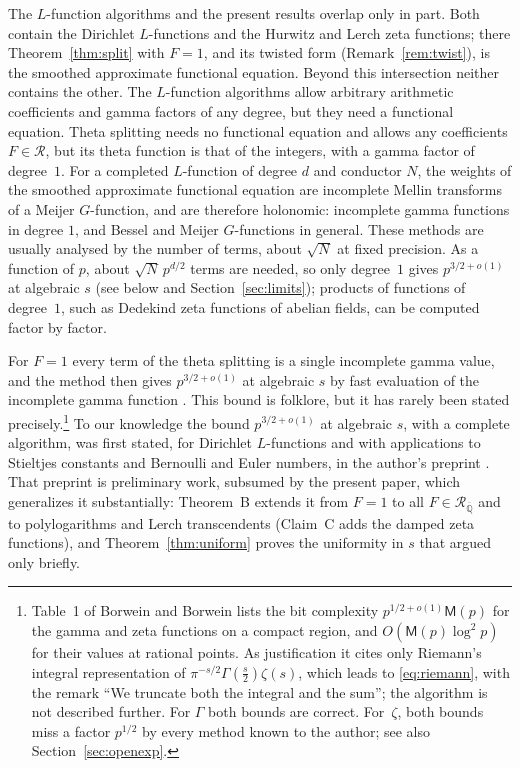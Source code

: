 \documentclass[11pt,reqno]{amsart}
\theoremstyle{definition}
\theoremstyle{remark}
\newcommand{\Qbar}{\overline{\mathbb{Q}}}
\newcommand{\Reg}{\mathcal{R}}
\newcommand{\RegQ}{\mathcal{R}_{\Qbar}}
\newcommand{\Mul}{\mathsf{M}}
\begin{document}
The $L$-function algorithms and the present results overlap only in part. Both contain the Dirichlet $L$-functions and
the Hurwitz and Lerch zeta functions; there Theorem~\ref{thm:split} with $F = 1$, and its twisted form
(Remark~\ref{rem:twist}), is the smoothed approximate functional equation. Beyond this intersection neither contains the other. The $L$-function algorithms allow arbitrary arithmetic
coefficients and gamma factors of any degree, but they need a functional equation. Theta splitting needs no functional
equation and allows any coefficients $F \in \Reg$, but its theta function is that of the integers, with a gamma factor
of degree~$1$. For a completed $L$-function of degree $d$ and conductor $N$, the weights of the smoothed
approximate functional equation are incomplete Mellin transforms of a Meijer $G$-function, and are therefore
holonomic: incomplete gamma functions in degree $1$, and Bessel and Meijer $G$-functions in general. These methods are
usually analysed by the number of terms, about $\sqrt N$ at fixed precision. As a function of $p$, about
$\sqrt N\,p^{d/2}$ terms are needed, so only degree~$1$ gives $p^{3/2+o(1)}$ at algebraic $s$ (see below and
Section~\ref{sec:limits}); products of functions of degree~$1$, such as Dedekind zeta functions of abelian fields, can
be computed factor by factor.

For $F = 1$ every term of the theta splitting is a single incomplete gamma value, and the method then
gives $p^{3/2+o(1)}$ at algebraic $s$ by fast evaluation of the incomplete gamma function \cite{CC90,vdH99}.
This bound is folklore, but it has rarely been stated precisely.\footnote{Table~1 of Borwein and Borwein \cite{BB88} lists
the bit complexity $p^{1/2+o(1)}\Mul(p)$ for the gamma and zeta functions on a compact region, and
$O(\Mul(p)\log^2p)$ for their values at rational points. As justification it cites only Riemann's integral
representation of $\pi^{-s/2}\Gamma(\frac s2)\zeta(s)$, which leads to \eqref{eq:riemann}, with the remark ``We
truncate both the integral and the sum''; the algorithm is not described further. For $\Gamma$ both bounds are
correct. For~$\zeta$, both bounds miss a factor $p^{1/2}$ by every method known to the author; see also Section~\ref{sec:openexp}.}
To our knowledge the bound $p^{3/2+o(1)}$ at algebraic $s$, with a complete algorithm, was first stated, for
Dirichlet $L$-functions and with applications to
Stieltjes constants and Bernoulli and Euler numbers, in the author's preprint \cite{Joh21}. That preprint is
preliminary work, subsumed by the present paper, which generalizes it substantially: Theorem~B extends it from
$F = 1$ to all $F \in \RegQ$ and to polylogarithms and Lerch transcendents (Claim~C adds the damped zeta functions), and Theorem~\ref{thm:uniform} proves the uniformity in $s$
that \cite{Joh21} argued only briefly.
\end{document}
